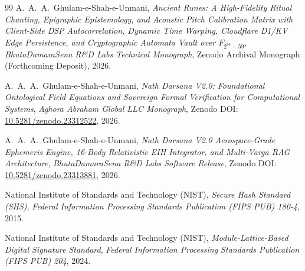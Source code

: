\documentclass[11pt,a4paper,reqno]{article}
\newcommand{\zenodo}[1]{\href{https://doi.org/10.5281/zenodo.#1}{\texttt{10.5281/\allowbreak zenodo.#1}}}
\def\texttt#1{#1}%
\def\mathbb#1{#1}%
\theoremstyle{plain}
\theoremstyle{definition}
\theoremstyle{remark}
\numberwithin{equation}{section}
\begin{document}
\begin{thebibliography}{99}
A.~A.~A.~Ghulam-e-Shah-e-Unmani,
\emph{Ancient Runes: A High-Fidelity Ritual Chanting, Epigraphic Epistemology, and Acoustic Pitch Calibration Matrix with Client-Side DSP Autocorrelation, Dynamic Time Warping, Cloudflare D1/KV Edge Persistence, and Cryptographic Automata Vault over $\mathbb{F}_{2^{64}-59}$},
\emph{BhutaDamaraSena R\&D Labs Technical Monograph}, Zenodo Archival Monograph (Forthcoming Deposit), 2026.

A.~A.~A.~Ghulam-e-Shah-e-Unmani,
\emph{Nath Darsana V2.0: Foundational Ontological Field Equations and Sovereign Formal Verification for Computational Systems},
\emph{Aghora Abraham Global LLC Monograph}, Zenodo DOI: \zenodo{23312522}, 2026.

A.~A.~A.~Ghulam-e-Shah-e-Unmani,
\emph{Nath Darsana V2.0 Aerospace-Grade Ephemeris Engine, 16-Body Relativistic EIH Integrator, and Multi-Varga RAG Architecture},
\emph{BhutaDamaraSena R\&D Labs Software Release}, Zenodo DOI: \zenodo{23313881}, 2026.

National Institute of Standards and Technology (NIST),
\emph{Secure Hash Standard (SHS)},
\emph{Federal Information Processing Standards Publication (FIPS PUB) 180-4}, 2015.

National Institute of Standards and Technology (NIST),
\emph{Module-Lattice-Based Digital Signature Standard},
\emph{Federal Information Processing Standards Publication (FIPS PUB) 204}, 2024.

\end{thebibliography}
\end{document}
